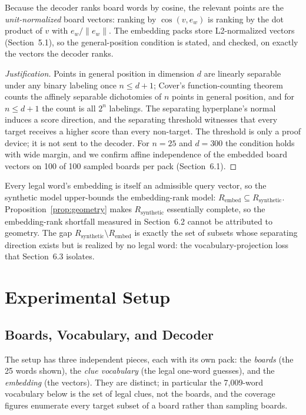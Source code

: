 \documentclass[11pt]{article}
\begin{document}
Because the decoder ranks board words by cosine, the relevant points are the
\emph{unit-normalized} board vectors: ranking by $\cos(v, e_w)$ is ranking by the
dot product of $v$ with $e_w / \|e_w\|$. The embedding packs store L2-normalized
vectors (Section~5.1), so the general-position condition is stated, and checked,
on exactly the vectors the decoder ranks.

\begin{proof}[Justification]
Points in general position in dimension $d$ are linearly separable under any
binary labeling once $n \le d + 1$; Cover's function-counting theorem counts the
affinely separable dichotomies of $n$ points in general position, and for
$n \le d + 1$ the count is all $2^n$ labelings. The separating hyperplane's
normal induces a score direction, and the separating threshold witnesses that
every target receives a higher score than every non-target. The threshold is only
a proof device; it is not sent to the decoder. For $n = 25$ and $d = 300$ the
condition holds with wide margin, and we confirm affine independence of the
embedded board vectors on 100 of 100 sampled boards per pack (Section~6.1).
\end{proof}

Every legal word's embedding is itself an admissible query vector, so the
synthetic model upper-bounds the embedding-rank model:
$R_{\mathrm{embed}} \subseteq R_{\mathrm{synthetic}}$.
Proposition~\ref{prop:geometry} makes $R_{\mathrm{synthetic}}$ essentially
complete, so the embedding-rank shortfall measured in Section~6.2 cannot be
attributed to geometry. The gap
$R_{\mathrm{synthetic}} \setminus R_{\mathrm{embed}}$ is exactly the set of
subsets whose separating direction exists but is realized by no legal word: the
vocabulary-projection loss that Section~6.3 isolates.

\section{Experimental Setup}\label{sec:setup}

\subsection{Boards, Vocabulary, and Decoder}

The setup has three independent pieces, each with its own pack: the \emph{boards}
(the 25 words shown), the \emph{clue vocabulary} (the legal one-word guesses), and
the \emph{embedding} (the vectors). They are distinct; in particular the
7,009-word vocabulary below is the set of legal clues, not the boards, and the
coverage figures enumerate every target subset of a board rather than sampling
boards.
\end{document}

